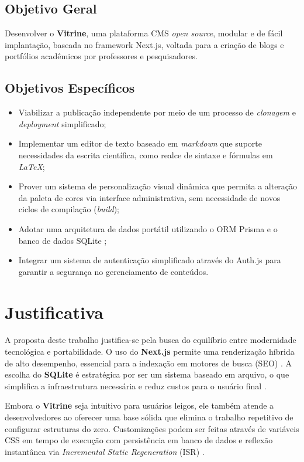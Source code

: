 \subsection{Objetivo Geral}
Desenvolver o \textbf{Vitrine}, uma plataforma CMS \textit{open source}, modular e de fácil implantação, baseada no framework Next.js, voltada para a criação de blogs e portfólios acadêmicos por professores e pesquisadores.

\subsection{Objetivos Específicos}
\begin{itemize}
    \item Viabilizar a publicação independente por meio de um processo de \textit{clonagem} e \textit{deployment} simplificado;
    \item Implementar um editor de texto baseado em \textit{markdown} que suporte necessidades da escrita científica, como realce de sintaxe e fórmulas em \textit{LaTeX};
    \item Prover um sistema de personalização visual dinâmica que permita a alteração da paleta de cores via interface administrativa, sem necessidade de novos ciclos de compilação (\textit{build});
    \item Adotar uma arquitetura de dados portátil utilizando o ORM Prisma e o banco de dados SQLite \cite{prisma_docs};
    \item Integrar um sistema de autenticação simplificado através do Auth.js para garantir a segurança no gerenciamento de conteúdos.
\end{itemize}

\section{Justificativa}
A proposta deste trabalho justifica-se pela busca do equilíbrio entre modernidade tecnológica e portabilidade. O uso do \textbf{Next.js} permite uma renderização híbrida de alto desempenho, essencial para a indexação em motores de busca (SEO) \cite{nextjs_docs}. A escolha do \textbf{SQLite} é estratégica por ser um sistema baseado em arquivo, o que simplifica a infraestrutura necessária e reduz custos para o usuário final \cite{prisma_docs}.

Embora o \textbf{Vitrine} seja intuitivo para usuários leigos, ele também atende a desenvolvedores ao oferecer uma base sólida que elimina o trabalho repetitivo de configurar estruturas do zero. Customizações podem ser feitas através de variáveis CSS em tempo de execução com persistência em banco de dados e reflexão instantânea via \textit{Incremental Static Regeneration} (ISR) \cite{nextjs_docs}.

